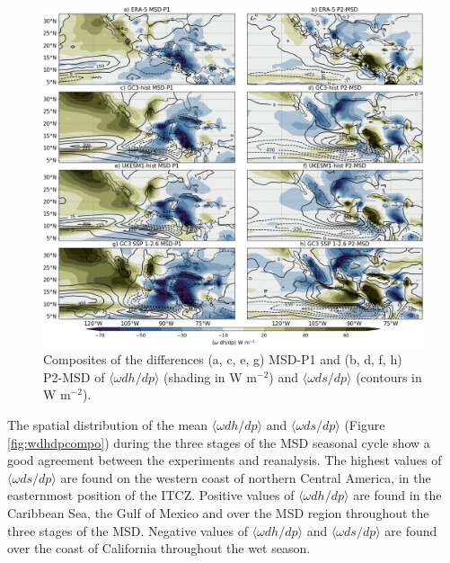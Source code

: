 \begin{figure}[t!]
\includegraphics[width=\linewidth]{figures/thermocompositewdhdpanom.png}
\caption[Composites of the anomalous vertical advection of the MSE budget]{Composites of the differences (a, c, e, g) MSD-P1 and (b, d, f, h) P2-MSD of $\langle \omega dh/dp \rangle$ (shading in W m$^{-2}$) and $\langle \omega ds/dp \rangle$ (contours in W m$^{-2}$).  }
\label{fig:wdhdpanom}
\end{figure} 
 

The spatial distribution of the mean $\langle \omega dh/dp \rangle$ and $\langle \omega ds/dp \rangle$ (Figure \ref{fig:wdhdpcompo}) during the three stages of the MSD seasonal cycle show a good agreement between the experiments and reanalysis. The highest values of $\langle \omega ds/dp \rangle$ are found on the western coast of northern Central America, in the easternmost position of the ITCZ. Positive values of $\langle \omega dh/dp \rangle$  are found in the Caribbean Sea, the Gulf of Mexico and over the MSD region throughout the three stages of the MSD. Negative values of $\langle \omega dh/dp \rangle$ and $\langle \omega ds/dp \rangle$ are found over the coast of California throughout the wet season. 


